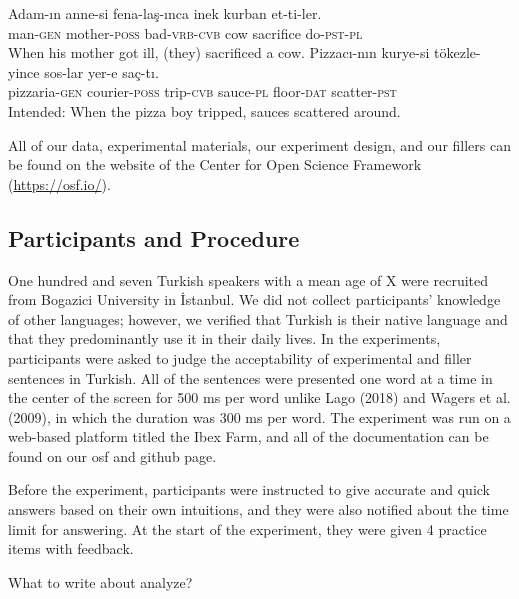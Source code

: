 \documentclass[11pt,a4paper]{article}
\begin{document}
\begin{exe}
\ex
\begin{xlist}
\ex \label{fillera}
\gll Adam-{\i}n anne-si fena-la\c{s}-{\i}nca inek kurban et-ti-ler.\\
man-\textsc{gen} mother-\textsc{poss} bad-\textsc{vrb}-\textsc{cvb} cow sacrifice do-\textsc{pst}-\textsc{pl}\\
\glt When his mother got ill, (they) sacrificed a cow.
\ex \label{fillerb}
\gll *Pizzac{\i}-n{\i}n kurye-si t\"{o}kezle-yince sos-lar yer-e sa\c{c}-t{\i}.\\
pizzaria-\textsc{gen} courier-\textsc{poss} trip-\textsc{cvb} sauce-\textsc{pl} floor-\textsc{dat} scatter-\textsc{pst}\\
\glt Intended: When the pizza boy tripped, sauces scattered around. 
\end{xlist}
\end{exe}

All of our data, experimental materials, our experiment design, and our
fillers can be found on the website of the Center for Open Science
Framework (\url{https://osf.io/}).

\hypertarget{participants-and-procedure}{%
\subsection{Participants and
Procedure}\label{participants-and-procedure}}

One hundred and seven Turkish speakers with a mean age of X were
recruited from Bogazici University in İstanbul. We did not collect
participants' knowledge of other languages; however, we verified that
Turkish is their native language and that they predominantly use it in
their daily lives. In the experiments, participants were asked to judge
the acceptability of experimental and filler sentences in Turkish. All
of the sentences were presented one word at a time in the center of the
screen for 500 ms per word unlike Lago (2018) and Wagers et al. (2009),
in which the duration was 300 ms per word. The experiment was run on a
web-based platform titled the Ibex Farm, and all of the documentation
can be found on our osf and github page.

Before the experiment, participants were instructed to give accurate and
quick answers based on their own intuitions, and they were also notified
about the time limit for answering. At the start of the experiment, they
were given 4 practice items with feedback.

What to write about analyze?
\end{document}

